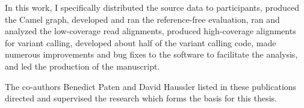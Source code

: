\begin{frontmatter}
\begin{acknowledgements}
{}

In this work, I specifically distributed the source data to participants, produced the Camel graph, developed and ran the reference-free evaluation, ran and analyzed the low-coverage read alignments, produced high-coverage alignments for variant calling, developed about half of the variant calling code, made numerous improvements and bug fixes to the \vg software to facilitate the analysis, and led the production of the manuscript.

The co-authors Benedict Paten and David Haussler listed in these publications directed and supervised the research which forms the basis for this thesis.
\end{acknowledgements}

\end{frontmatter}
